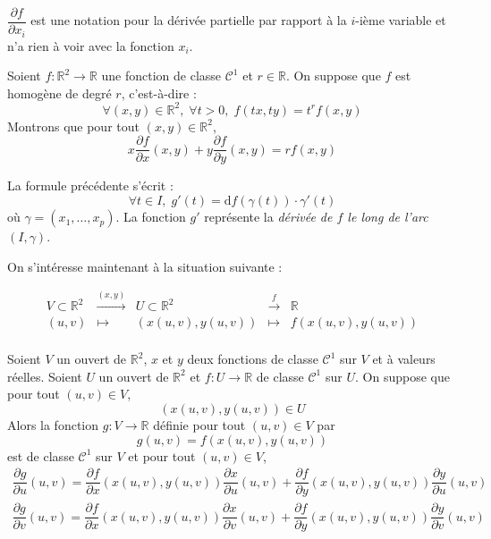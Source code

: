 \documentclass[french,11pt,twoside]{VcCours}
\begin{document}
\begin{Remarque}[\alerte]{} $\dfrac{\partial f}{\partial x_i}$ est une notation pour la dérivée partielle par rapport à la $i$-ième variable et n'a rien à voir avec la fonction $x_i$.
\end{Remarque}

\medskip

\begin{Exemple}{} Soient $f : \mathbb{R}^2 \rightarrow \mathbb{R}$ une fonction de classe $\mathcal{C}^1$ et $r \in \mathbb{R}$. On suppose que $f$ est homogène de degré $r$, c'est-à-dire :
$$ \forall (x,y) \in \mathbb{R}^2, \; \forall t >0, \; f(tx,ty) = t^r f(x,y)$$
Montrons que pour tout $(x,y) \in \mathbb{R}^2$,
$$ x \dfrac{\partial f}{\partial x}(x,y) + y \dfrac{\partial f}{\partial y}(x,y) =r f(x,y)$$

\vspace{5cm}
\end{Exemple}


\newpage

\begin{Remarque}{} La formule précédente s'écrit :
$$ \forall t \in I, \; g'(t) =\textrm{d}f(\gamma(t)) \cdot \gamma'(t)$$
où $\gamma =(x_1, \ldots, x_p)$. La fonction $g'$ représente la \emph{dérivée de $f$ le long de l'arc} $(I, \gamma)$.
\end{Remarque}

\medskip

On s'intéresse maintenant à la situation suivante : 

$$ \begin{array}{ccccccc}
V \subset \mathbb{R}^2 & \overset{(x,y)}{\rightarrow} & U \subset \mathbb{R}^2 & \overset{f}{\rightarrow} & \mathbb{R} \\
(u,v) & \mapsto & (x(u,v),y(u,v)) & \mapsto & f(x(u,v),y(u,v)) \\
\end{array}$$

\begin{Proposition}{} Soient $V$ un ouvert de $\mathbb{R}^2$, $x$ et $y$ deux fonctions de classe $\mathcal{C}^1$ sur $V$ et à valeurs réelles. Soient $U$ un ouvert de $\mathbb{R}^2$ et $f : U \rightarrow \mathbb{R}$ de classe $\mathcal{C}^1$ sur $U$. On suppose que pour tout $(u,v) \in V$,
$$ (x(u,v),y(u,v)) \in U$$
Alors la fonction $g : V \rightarrow \mathbb{R}$ définie pour tout $(u,v) \in V$ par 
$$ g(u,v) = f(x(u,v),y(u,v))$$
est de classe $\mathcal{C}^1$ sur $V$ et pour tout $(u,v) \in V$,
\begin{align*}
\dfrac{\partial g}{\partial u} (u,v) = \dfrac{\partial f}{\partial x}(x(u,v),y(u,v)) \dfrac{\partial x}{\partial u}(u,v) + \dfrac{\partial f}{\partial y}(x(u,v),y(u,v)) \dfrac{\partial y}{\partial u}(u,v) \\
\dfrac{\partial g}{\partial v} (u,v) = \dfrac{\partial f}{\partial x}(x(u,v),y(u,v)) \dfrac{\partial x}{\partial v}(u,v) + \dfrac{\partial f}{\partial y}(x(u,v),y(u,v)) \dfrac{\partial y}{\partial v}(u,v) \\
\end{align*}
\end{Proposition}
\end{document}
